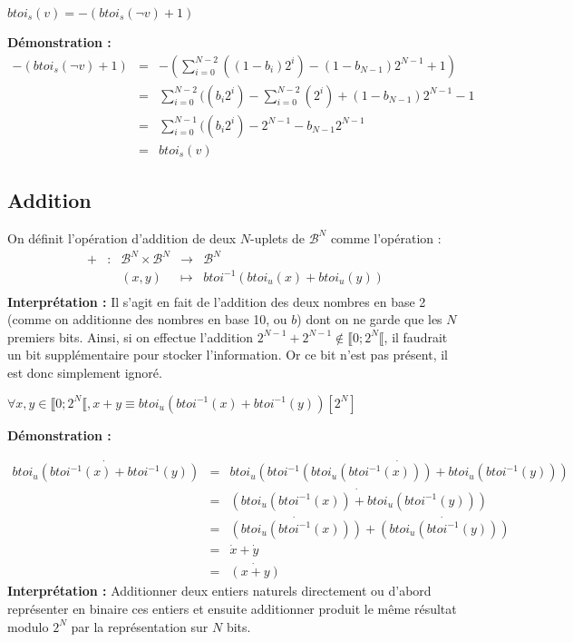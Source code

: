 \documentclass[../../main.tex]{subfiles}
\begin{document}
\proposition{} $btoi_{s}(v) = -(btoi_{s}(\neg{v}) + 1)$

\textbf{Démonstration :}
\[
\begin{array}{lcl}
-(btoi_{s}(\neg{v}) + 1) & = & -(\displaystyle\sum_{i = 0}^{N-2}((1-b_{i})2^{i}) - (1-b_{N-1})2^{N-1} + 1) \\
& = & \displaystyle\sum_{i = 0}^{N-2}((b_{i}2^{i}) - \displaystyle\sum_{i = 0}^{N-2}(2^{i}) + (1 - b_{N-1})2^{N-1} - 1 \\
& = & \displaystyle\sum_{i = 0}^{N-1}((b_{i}2^{i}) - 2^{N-1} - b_{N-1}2^{N-1} \\
& = & btoi_{s}(v)
\end{array}
\]
\subsection{Addition} \label{sub:addition}
On définit l'opération d'addition de deux $N$-uplets de $\mathcal{B}^{N}$ comme l'opération :
$$
\begin{array}{lclcl}
+ & : & \mathcal{B}^{N}\times{\mathcal{B}^{N}} & \rightarrow & \mathcal{B}^{N} \\
  &   & (x, y) & \mapsto & btoi^{-1}(btoi_{u}(x) + btoi_{u}(y)) \\
\end{array}
$$
\textbf{Interprétation :} Il s'agit en fait de l'addition des deux nombres en base 2 (comme on additionne des nombres en base 10, ou $b$) dont on ne garde que les $N$ premiers bits. Ainsi, si on effectue l'addition $2^{N-1} + 2^{N-1}\notin{\llbracket 0; 2^{N}\llbracket}$, il faudrait un bit supplémentaire pour stocker l'information. Or ce bit n'est pas présent, il est donc simplement ignoré.

 $\forall{x, y\in{\llbracket 0; 2^{N}\llbracket}}, x + y \equiv btoi_{u}(btoi^{-1}(x) + btoi^{-1}(y)) [2^{N}]$

\textbf{Démonstration :}

\[
\begin{array}{lcl}
\dot{btoi_{u}(btoi^{-1}(x) + btoi^{-1}(y))} & = & \dot{btoi_{u}(btoi^{-1}(btoi_{u}(btoi^{-1}(x))) + btoi_{u}(btoi^{-1}(y)))} \\
 & = & \dot{(btoi_{u}(btoi^{-1}(x)) + btoi_{u}(btoi^{-1}(y)))} \\
 & = & \dot{(btoi_{u}(btoi^{-1}(x)))} + \dot{(btoi_{u}(btoi^{-1}(y)))} \\
 & = & \dot{x} + \dot{y} \\
 & = & \dot{(x + y)}
\end{array}
\]
\textbf{Interprétation :} Additionner deux entiers naturels directement ou d'abord représenter en binaire ces entiers et ensuite additionner produit le même résultat modulo $2^{N}$ par la représentation sur $N$ bits.
\end{document}
